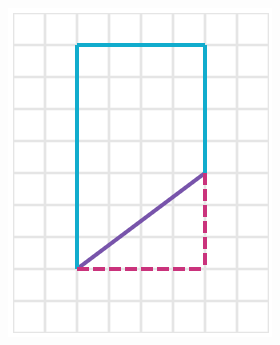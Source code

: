 \begin{solutionbox}{16cm}
    \begin{minipage}{0.4\textwidth}
        \begin{multicols}{2}
            \begin{figure}[H]
                \centering
                \includegraphics[width=0.9\linewidth]{../images/peri_trap_02a.png}
                \caption{}
                \label{fig:peri_trap_02a}
            \end{figure}
            \begin{figure}[H]
                \centering

\end{figure}
\end{multicols}
\end{minipage}
\end{solutionbox}
